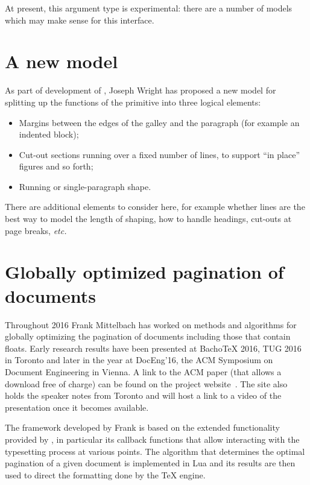 \documentclass{ltnews}
\begin{document}
At present, this argument type is experimental: there are a number of models
which may make sense for this interface.

\section{A new  model}

As part of development of , Joseph Wright has proposed a new
model for splitting up the functions of the  primitive into three
logical elements:
\begin{itemize}
  \item Margins between the edges of the galley and the paragraph (for example
    an indented block);
  \item Cut-out sections running over a fixed number of lines, to support
    \enquote{in place} figures and so forth;
  \item Running or single-paragraph shape.
\end{itemize}

There are additional elements to consider here, for example whether lines are
the best way to model the length of shaping, how to handle headings, cut-outs
at page breaks, \emph{etc.}


\section{Globally optimized pagination of documents}

Throughout 2016 Frank Mittelbach has worked on methods and algorithms for
globally optimizing the pagination of documents including those that contain
floats. Early research results have been presented at Bacho\TeX{} 2016, TUG
2016 in Toronto and later in the year at \mbox{DocEng'16}, the ACM Symposium on
Document Engineering in Vienna. A link to the ACM paper (that allows a download
free of charge) can be found on the project
website~\cite{project-publications}. The site also holds the speaker notes from
Toronto and will host a link to a video of the presentation once it becomes
available.

The framework developed by Frank is based on the extended functionality
provided by , in particular its callback functions that allow
interacting with the typesetting process at various points. The algorithm that
determines the optimal pagination of a given document is implemented in {Lua}
and its results are then used to direct the formatting done by the \TeX{}
engine.
\end{document}
